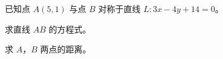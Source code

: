 \documentclass[12pt,a4paper]{exam-zh}
\newcommand{\qscoreoffset}{4em}
\newcommand{\qscore}[2][\%]{%
    \leavevmode\unskip\nobreak\hfill
    \makebox[0pt][l]{\makebox[\qscoreoffset][r]{(#2#1)}}%
}
\begin{document}

\begin{question}[points = 6]
    已知点 $A(5,1)$ 与点 $B$ 对称于直线 $L:3x-4y+14=0$。
    \begin{questionparts}
        \item 求直线 $AB$ 的方程式。 \qscore{3}
        \item 求 $A$，$B$ 两点的距离。 \qscore{3}
    \end{questionparts}
\end{question}
\end{document}
